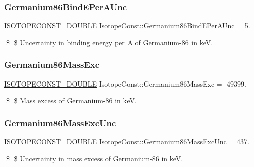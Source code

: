 \subsubsection{\texorpdfstring{Germanium86\+Bind\+E\+Per\+A\+Unc}{Germanium86BindEPerAUnc}}
{\footnotesize\ttfamily \mbox{\hyperlink{group___isotope_const-_macros_ga8f45a7272ce02c0b4c65c44636ed719a}{I\+S\+O\+T\+O\+P\+E\+C\+O\+N\+S\+T\+\_\+\+D\+O\+U\+B\+LE}} Isotope\+Const\+::\+Germanium86\+Bind\+E\+Per\+A\+Unc = 5.}

\$ \$ Uncertainty in binding energy per A of Germanium-\/86 in keV. \mbox{\label{group___isotope_const-_germanium-_ge86_ga9f983a2d92bbca11905621ef719c37ed}} 
\subsubsection{\texorpdfstring{Germanium86\+Mass\+Exc}{Germanium86MassExc}}
{\footnotesize\ttfamily \mbox{\hyperlink{group___isotope_const-_macros_ga8f45a7272ce02c0b4c65c44636ed719a}{I\+S\+O\+T\+O\+P\+E\+C\+O\+N\+S\+T\+\_\+\+D\+O\+U\+B\+LE}} Isotope\+Const\+::\+Germanium86\+Mass\+Exc = -\/49399.}

\$ \$ Mass excess of Germanium-\/86 in keV. \mbox{\label{group___isotope_const-_germanium-_ge86_gafe7c04360c266c048c195038bdd7fb25}} 
\subsubsection{\texorpdfstring{Germanium86\+Mass\+Exc\+Unc}{Germanium86MassExcUnc}}
{\footnotesize\ttfamily \mbox{\hyperlink{group___isotope_const-_macros_ga8f45a7272ce02c0b4c65c44636ed719a}{I\+S\+O\+T\+O\+P\+E\+C\+O\+N\+S\+T\+\_\+\+D\+O\+U\+B\+LE}} Isotope\+Const\+::\+Germanium86\+Mass\+Exc\+Unc = 437.}

\$ \$ Uncertainty in mass excess of Germanium-\/86 in keV. \mbox{\label{group___isotope_const-_germanium-_ge86_ga00cee77f89ae55ff48a99d849040a044}} 
